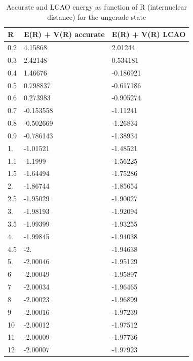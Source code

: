 \begin{table}[ht]
  \caption{Accurate and LCAO energy as function of R (internuclear distance) for the ungerade state}
  \centering
  \label{tab:lcaotabU}
  \begin{tabular}{ m{4em} m{4em} m{4em} }
    \hline
    R & E(R) + V(R) accurate  &  E(R) + V(R) LCAO \\ \hline \hline
    0.2 & 4.15868  & 2.01244 \\
 0.3 & 2.42148 & 0.534181 \\
    0.4 & 1.46676  & -0.186921 \\
 0.5 & 0.798837 & -0.617186 \\
 0.6 & 0.273983 & -0.905274 \\
 0.7 & -0.153558 & -1.11241 \\
 0.8 & -0.502669 & -1.26834 \\
 0.9 & -0.786143 & -1.38934 \\
 1. & -1.01521 & -1.48521 \\
 1.1 & -1.1999 & -1.56225 \\
 1.5 & -1.64494 & -1.75286 \\
 2. & -1.86744 & -1.85654 \\
 2.5 & -1.95029 & -1.90027 \\
 3. & -1.98193 & -1.92094 \\
 3.5 & -1.99399 & -1.93255 \\
 4. & -1.99845 & -1.94038 \\
 4.5 & -2. & -1.94638 \\
 5. & -2.00046 & -1.95129 \\
 6 & -2.00049 & -1.95897 \\
 7 & -2.00034 & -1.96465 \\
 8 & -2.00023  & -1.96899 \\
 9 & -2.00016 & -1.97239 \\
 10 & -2.00012 & -1.97512 \\
 11 & -2.00009 & -1.97736 \\
 12 & -2.00007  & -1.97923 \\
  \hline
   \end{tabular}
\label{tableU}
\end{table}

\clearpage

